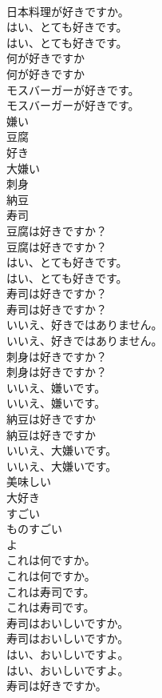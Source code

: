 \documentclass[8pt]{extreport}
\begin{document}
\begin{CJK}{UTF8}{min}
\\	日本料理が好きですか。 
\\	はい、とても好きです。	
\\	はい、とても好きです。 
\\	何が好きですか	
\\	何が好きですか 
\\	モスバーガーが好きです。	
\\	モスバーガーが好きです。 
\\	嫌い
\\	豆腐
\\	好き
\\	大嫌い
\\	刺身
\\	納豆
\\	寿司
\\	豆腐は好きですか？	
\\	豆腐は好きですか？ 
\\	はい、とても好きです。	
\\	はい、とても好きです。 
\\	寿司は好きですか？	
\\	寿司は好きですか？ 
\\	いいえ、好きではありません。	
\\	いいえ、好きではありません。 
\\	刺身は好きですか？	
\\	刺身は好きですか？ 
\\	いいえ、嫌いです。	
\\	いいえ、嫌いです。 
\\	納豆は好きですか	
\\	納豆は好きですか 
\\	いいえ、大嫌いです。	
\\	いいえ、大嫌いです。 
\\	美味しい
\\	大好き
\\	すごい
\\	ものすごい
\\	よ
\\	これは何ですか。	
\\	これは何ですか。 
\\	これは寿司です。	
\\	これは寿司です。 
\\	寿司はおいしいですか。	
\\	寿司はおいしいですか。 
\\	はい、おいしいですよ。	
\\	はい、おいしいですよ。 
\\	寿司は好きですか。	

\end{CJK}
\end{document}

